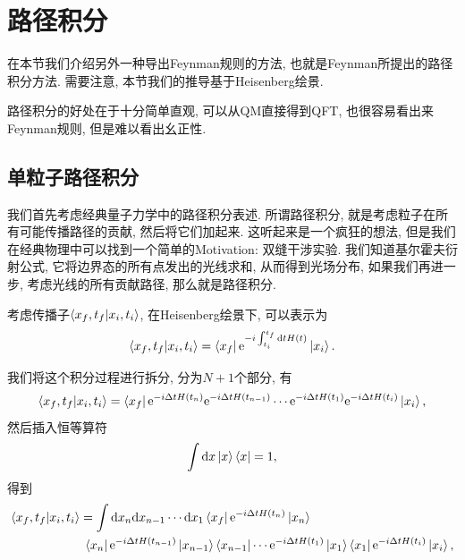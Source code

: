 \section{路径积分}
在本节我们介绍另外一种导出Feynman规则的方法, 也就是Feynman所提出的路径积分方法. 需要注意, 本节我们的推导基于Heisenberg绘景.

路径积分的好处在于十分简单直观, 可以从QM直接得到QFT, 也很容易看出来Feynman规则, 但是难以看出幺正性.

\subsection{单粒子路径积分}
我们首先考虑经典量子力学中的路径积分表述. 所谓路径积分, 就是考虑粒子在所有可能传播路径的贡献, 然后将它们加起来. 这听起来是一个疯狂的想法, 但是我们在经典物理中可以找到一个简单的Motivation: 双缝干涉实验. 我们知道基尔霍夫衍射公式, 它将边界态的所有点发出的光线求和, 从而得到光场分布, 如果我们再进一步, 考虑光线的所有贡献路径, 那么就是路径积分.

考虑传播子$\braket{x_f, t_f|x_i, t_i}$, 在Heisenberg绘景下, 可以表示为
\begin{equation}
    \braket{x_f, t_f|x_i, t_i}=\bra{x_f}\mathrm e^{-i\int_{t_i}^{t_f}\mathrm d tH(t)}\ket{x_i}.
\end{equation}

我们将这个积分过程进行拆分, 分为$N+1$个部分, 有
\begin{equation}
    \braket{x_f, t_f|x_i, t_i}=\bra{x_f}\mathrm e^{-i\Delta tH(t_n)}\mathrm e^{-i\Delta tH(t_{n-1})}\cdots\mathrm e^{-i\Delta tH(t_1)}\mathrm e^{-i\Delta tH(t_i)}\ket{x_i},
\end{equation}
然后插入恒等算符
\begin{equation}
    \int\mathrm dx\ket{x}\bra{x}=1,
\end{equation}
得到
\begin{align}
    \braket{x_f, t_f|x_i, t_i}&=\int\mathrm dx_n\mathrm dx_{n-1}\cdots\mathrm dx_1\bra{x_f}\mathrm e^{-i\Delta tH(t_n)}\ket{x_n}\notag\\
    &\;\bra{x_n}\mathrm e^{-i\Delta tH(t_{n-1})}\ket{x_{n-1}}\bra{x_{n-1}}\cdots\mathrm e^{-i\Delta tH(t_1)}\ket{x_{1}}\bra{x_{1}}\mathrm e^{-i\Delta tH(t_i)}\ket{x_i},
\end{align}

